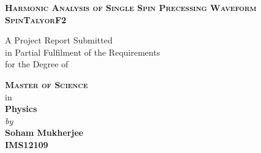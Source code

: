 \documentclass[12pt, a4wide]{report}
\theoremstyle{plain}
\theoremstyle{definition}
\theoremstyle{remark}
\begin{document}


\begin{titlepage}
\enlargethispage{10mm}
\begin{center}
\vspace*{-10mm}

\textbf{\textsc{\Large Harmonic Analysis of Single Spin Precessing Waveform SpinTalyorF2}}\\

\vspace*{10mm}

A Project Report Submitted \\
in Partial Fulfilment of the Requirements  \\
for the Degree of  \\

\vspace{5mm}

\textbf{\textsc{\Large Master of Science}}\\
in \\
{\large \bf Physics} \\
\vspace{7mm}
{\textit{by}} \\ \vspace{2mm}
{\textbf{\large Soham Mukherjee}}\\
{\textbf{IMS12109}}\\

\vspace*{5.5mm}


\end{center}
\end{titlepage}
\end{document}
